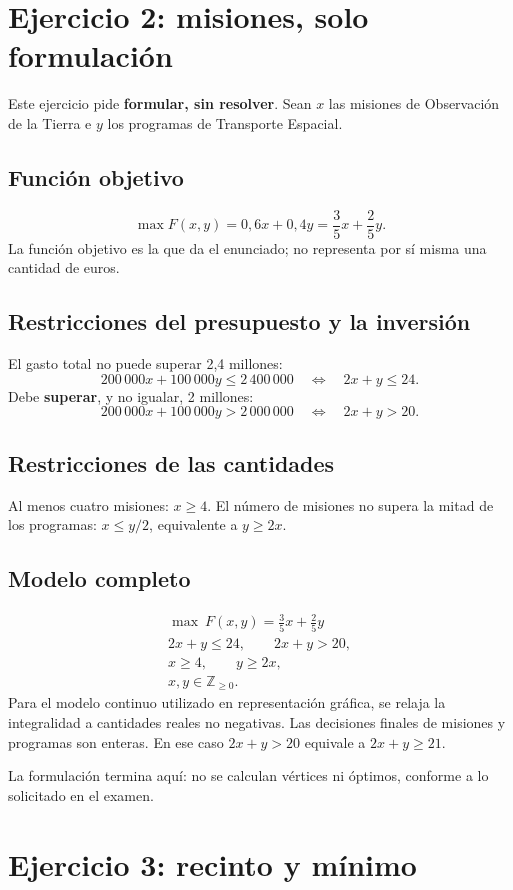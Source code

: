 \documentclass[11pt]{article}
\begin{document}
\section*{Ejercicio 2: misiones, solo formulación}
Este ejercicio pide \textbf{formular, sin resolver}. Sean $x$ las misiones de Observación de la Tierra e $y$ los programas de Transporte Espacial.
\subsection*{Función objetivo}
\[\max F(x,y)=0{,}6x+0{,}4y=\frac35x+\frac25y.\]
La función objetivo es la que da el enunciado; no representa por sí misma una cantidad de euros.
\subsection*{Restricciones del presupuesto y la inversión}
El gasto total no puede superar 2,4 millones:
\[200\,000x+100\,000y\leq2\,400\,000\quad\Longleftrightarrow\quad2x+y\leq24.\]
Debe \textbf{superar}, y no igualar, 2 millones:
\[200\,000x+100\,000y>2\,000\,000\quad\Longleftrightarrow\quad2x+y>20.\]
\subsection*{Restricciones de las cantidades}
Al menos cuatro misiones: $x\geq4$. El número de misiones no supera la mitad de los programas: $x\leq y/2$, equivalente a $y\geq2x$.
\subsection*{Modelo completo}
\[
\boxed{\begin{gathered}
\max\ F(x,y)=\frac35x+\frac25y\\
2x+y\leq24,\qquad2x+y>20,\\
x\geq4,\qquad y\geq2x,\\
x,y\in\mathbb Z_{\geq0}.
\end{gathered}}
\]
Para el modelo continuo utilizado en representación gráfica, se relaja la integralidad a cantidades reales no negativas. Las decisiones finales de misiones y programas son enteras. En ese caso $2x+y>20$ equivale a $2x+y\geq21$.

La formulación termina aquí: no se calculan vértices ni óptimos, conforme a lo solicitado en el examen.
\clearpage
\section*{Ejercicio 3: recinto y mínimo}
\end{document}
